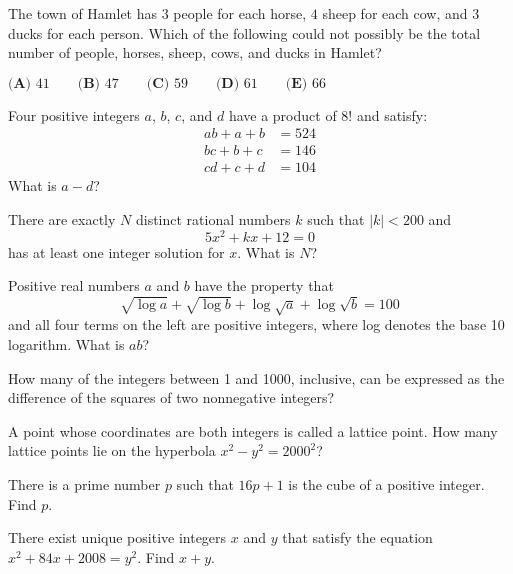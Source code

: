 \documentclass{article}
\begin{document}
\begin{prob}[AMC 10B 2015/15]{4}

The town of Hamlet has $3$ people for each horse, $4$ sheep for each cow, and $3$ ducks for each person. Which of the following could not possibly be the total number of people, horses, sheep, cows, and ducks in Hamlet?
\begin{center}
    $\textbf{(A) }41\qquad\textbf{(B) }47\qquad\textbf{(C) }59\qquad\textbf{(D) }61\qquad\textbf{(E) }66$
\end{center}

\end{prob}

\begin{prob}[AMC 12 2001/21]{6}

Four positive integers $a$, $b$, $c$, and $d$ have a product of $8!$ and satisfy:
\begin{align*} ab + a + b & = 524 \\  bc + b + c & = 146 \\  cd + c + d & = 104 \end{align*}
What is $a-d$?

\end{prob}

\begin{prob}[AMC 12A 2014/19]{6}

There are exactly $N$ distinct rational numbers $k$ such that $|k|<200$ and\[5x^2+kx+12=0\]has at least one integer solution for $x$. What is $N$?

\end{prob}

\begin{prob}[AMC 12A 2019/15]{6}

Positive real numbers $a$ and $b$ have the property that\[\sqrt{\log{a}} + \sqrt{\log{b}} + \log \sqrt{a} + \log \sqrt{b} = 100\]and all four terms on the left are positive integers, where log denotes the base 10 logarithm. What is $ab$?

\end{prob}

\begin{prob}[AIME 1997/1]{6}

How many of the integers between 1 and 1000, inclusive, can be expressed as the difference of the squares of two nonnegative integers?

\end{prob}

\begin{prob}[AIME II 2000/2]{9}

A point whose coordinates are both integers is called a lattice point. How many lattice points lie on the hyperbola $x^2 -y^2 = 2000^2$?

\end{prob}

\begin{prob}[AIME I 2015/3]{9}

There is a prime number $p$ such that $16p+1$ is the cube of a positive integer. Find $p$.

\end{prob}

\begin{prob}[AIME I 2008/4]{9}

There exist unique positive integers $x$ and $y$ that satisfy the equation $x^2 + 84x + 2008 = y^2$. Find $x + y$.

\end{prob}
\end{document}
